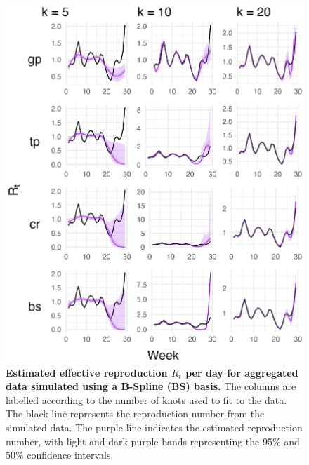 \documentclass[
11pt, %
oneside, %
english, %
singlespacing, %
]{macthesis} %
\begin{document}
\begin{figure}[H]
\centering
\includegraphics[width=\textwidth]{figure/Simulated/aggregated/simulation_agg_bs_20_k(5,10,20)_bsd1_beta1_plot_R_t.png}
\caption[Estimated Simulated and Aggregated Data (BS) Effective Reproduction Number]{\textbf{Estimated effective reproduction \(R_t\) per day for aggregated data simulated using a B-Spline (BS) basis.} The columns are labelled according to the number of knots used to fit to the data. The black line represents the reproduction number from the simulated data. The purple line indicates the estimated reproduction number, with light and dark purple bands representing the 95\% and 50\% confidence intervals.}
\label{fig:Rt20_agg_bs}
\end{figure}
\end{document}
